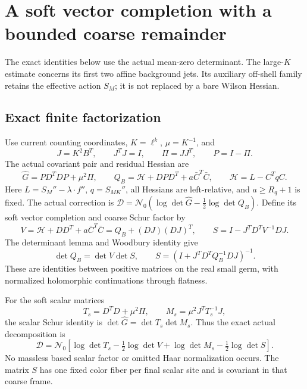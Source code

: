 \section{A soft vector completion with a bounded coarse remainder}
\label{svc-section}

The exact identities below use the actual mean-zero determinant.
The large-$K$ estimate concerns its first two affine background jets.
Its auxiliary off-shell family retains the effective action $S_M$;
it is not replaced by a bare Wilson Hessian.

\subsection{Exact finite factorization}
\label{svc-factor-section}

Use current counting coordinates, $K=\ell^k$, $\mu=K^{-1}$, and
\begin{equation}
 J=K^2B^T,\qquad J^TJ=I,\qquad \Pi=JJ^T,\qquad P=I-\Pi.
 \label{svc-projectors}
\end{equation}
The actual covariant pair and residual Hessian are
\begin{equation}
 \widehat G=PD^TDP+\mu^2\Pi,\qquad
 Q_B=\mathcal H+DPD^T+a\bar C^T\bar C,
 \qquad \mathcal H=L-C^TqC.
 \label{svc-actual}
\end{equation}
Here $L=S_M''-\lambda\cdot f''$, $q=S_{MK}''$, all Hessians are
left-relative, and $a\ge R_q+1$ is fixed. The actual correction is
$\mathcal D=\mathcal N_0(\log\det\widehat G-\tfrac12\log\det Q_B)$.
Define its soft vector completion and coarse Schur factor by
\begin{equation}
 V=\mathcal H+DD^T+a\bar C^T\bar C
        =Q_B+(DJ)(DJ)^T,
 \qquad S=I-J^TD^TV^{-1}DJ.
 \label{svc-soft-vector}
\end{equation}
The determinant lemma and Woodbury identity give
\begin{equation}
 \det Q_B=\det V\det S,\qquad
 S=(I+J^TD^TQ_B^{-1}DJ)^{-1}.
 \label{svc-schur}
\end{equation}
These are identities between positive matrices on the real small germ,
with normalized holomorphic continuations through flatness.

For the soft scalar matrices
\begin{equation}
 T_s=D^TD+\mu^2\Pi,\qquad M_s=\mu^2J^TT_s^{-1}J,
 \label{svc-soft-scalar}
\end{equation}
the scalar Schur identity is $\det\widehat G=\det T_s\det M_s$.
Thus the exact actual decomposition is
\begin{equation}
 \boxed{\displaystyle
 \mathcal D=\mathcal N_0\left[
 \log\det T_s-\tfrac12\log\det V
                 +\log\det M_s-\tfrac12\log\det S\right].}
 \label{svc-four-factor}
\end{equation}
No massless based scalar factor or omitted Haar normalization occurs.
The matrix $S$ has one fixed color fiber per final scalar site and is
covariant in that coarse frame.

